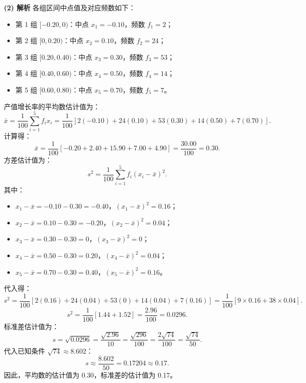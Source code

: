 \begin{answer}
\textbf{(2) 解析}
各组区间中点值及对应频数如下：
\begin{itemize}
\item 第 1 组 $[-0.20, 0)$：中点 $x_1 = -0.10$，频数 $f_1 = 2$；
\item 第 2 组 $[0, 0.20)$：中点 $x_2 = 0.10$，频数 $f_2 = 24$；
\item 第 3 组 $[0.20, 0.40)$：中点 $x_3 = 0.30$，频数 $f_3 = 53$；
\item 第 4 组 $[0.40, 0.60)$：中点 $x_4 = 0.50$，频数 $f_4 = 14$；
\item 第 5 组 $[0.60, 0.80)$：中点 $x_5 = 0.70$，频数 $f_5 = 7$。
\end{itemize}
产值增长率的平均数估计值为：
\nopagebreak[4]
\[\bar{x} = \frac{1}{100}\sum_{i=1}^5 f_i x_i = \frac{1}{100}[2(-0.10) + 24(0.10) + 53(0.30) + 14(0.50) + 7(0.70)].\]
计算得：
\nopagebreak[4]
\[\bar{x} = \frac{1}{100}[-0.20 + 2.40 + 15.90 + 7.00 + 4.90] = \frac{30.00}{100} = 0.30.\]
方差估计值为：
\nopagebreak[4]
\[s^2 = \frac{1}{100}\sum_{i=1}^5 f_i (x_i - \bar{x})^2.\]
其中：
\begin{itemize}
\item $x_1 - \bar{x} = -0.10 - 0.30 = -0.40$，$(x_1 - \bar{x})^2 = 0.16$；
\item $x_2 - \bar{x} = 0.10 - 0.30 = -0.20$，$(x_2 - \bar{x})^2 = 0.04$；
\item $x_3 - \bar{x} = 0.30 - 0.30 = 0$，$(x_3 - \bar{x})^2 = 0$；
\item $x_4 - \bar{x} = 0.50 - 0.30 = 0.20$，$(x_4 - \bar{x})^2 = 0.04$；
\item $x_5 - \bar{x} = 0.70 - 0.30 = 0.40$，$(x_5 - \bar{x})^2 = 0.16$。
\end{itemize}
代入得：
\nopagebreak[4]
\[s^2 = \frac{1}{100}[2(0.16) + 24(0.04) + 53(0) + 14(0.04) + 7(0.16)] = \frac{1}{100}[9 \times 0.16 + 38 \times 0.04].\]
\nopagebreak[4]
\[s^2 = \frac{1}{100}[1.44 + 1.52] = \frac{2.96}{100} = 0.0296.\]
标准差估计值为：
\nopagebreak[4]
\[s = \sqrt{0.0296} = \frac{\sqrt{2.96}}{10} = \frac{\sqrt{296}}{100} = \frac{2\sqrt{74}}{100} = \frac{\sqrt{74}}{50}.\]
代入已知条件 $\sqrt{74} \approx 8.602$：
\nopagebreak[4]
\[s \approx \frac{8.602}{50} = 0.17204 \approx 0.17.\]
因此，平均数的估计值为 0.30，标准差的估计值为 0.17。



\end{answer}

